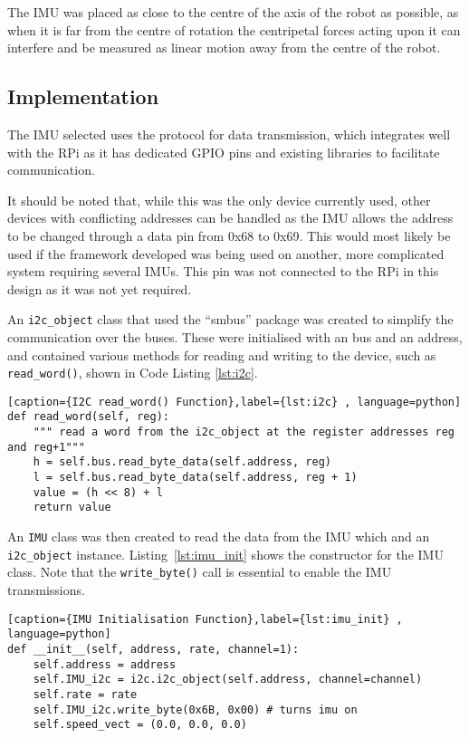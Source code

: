 The IMU was placed as close to the centre of the axis of the robot
as possible, as when it is far from the centre of rotation the centripetal
forces acting upon it can interfere and be measured as linear motion away
from the centre of the robot.

\subsection{Implementation}\label{elec/imu/impl}
The IMU selected uses the \isc{} protocol for data transmission, which
integrates well with the RPi as it has dedicated \isc{} GPIO pins and
existing libraries to facilitate communication.

It should be noted that, while this was the only \isc{} device currently
used, other devices with conflicting addresses can be handled as the IMU
allows the address to be changed through a data pin from 0x68 to 0x69.
This would most likely be used if the framework developed was being used
on another, more complicated system requiring several IMUs. This pin was
not connected to the RPi in this design as it was not yet required.

An \verb|i2c_object| class that used the ``smbus'' package was created to
simplify the communication over the \isc{} buses. These
were initialised with an \isc{} bus and an address, and
contained various methods for reading and writing to the \isc{} device, such as \verb|read_word()|, shown in Code Listing \ref{lst:i2c}.

\begin{lstlisting}[caption={I2C read_word() Function},label={lst:i2c} , language=python]
def read_word(self, reg):
    """ read a word from the i2c_object at the register addresses reg and reg+1"""
    h = self.bus.read_byte_data(self.address, reg)
    l = self.bus.read_byte_data(self.address, reg + 1)
    value = (h << 8) + l
    return value
\end{lstlisting}
An \verb|IMU| class was then created to read the data from the IMU which
and an \verb|i2c_object| instance. Listing~\ref{lst:imu_init} shows
the constructor for the IMU class. Note that the \verb|write_byte()| call
is essential to enable the IMU transmissions.

\begin{lstlisting}[caption={IMU Initialisation Function},label={lst:imu_init} , language=python]
def __init__(self, address, rate, channel=1):
    self.address = address
    self.IMU_i2c = i2c.i2c_object(self.address, channel=channel)
    self.rate = rate
    self.IMU_i2c.write_byte(0x6B, 0x00) # turns imu on
    self.speed_vect = (0.0, 0.0, 0.0)
\end{lstlisting}

